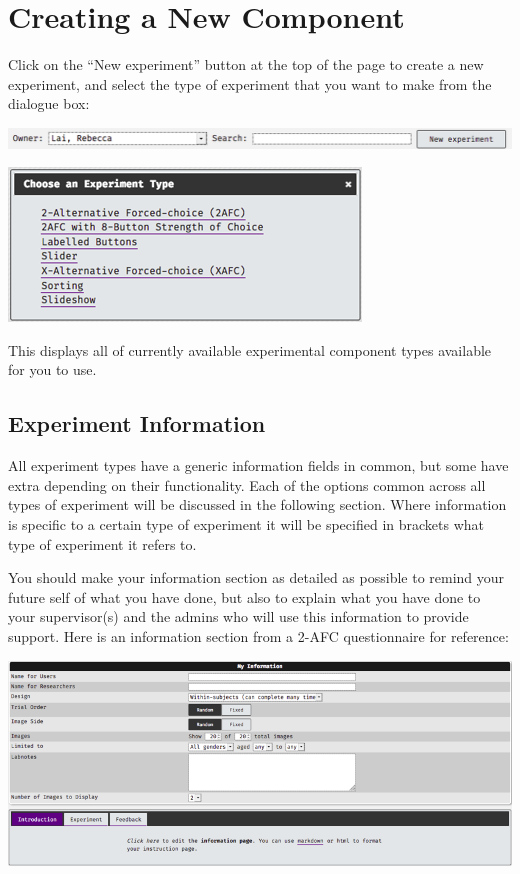 \documentclass[]{book}
\begin{document}
\section{Creating a New Component}\label{creating-a-new-component}

Click on the ``New experiment'' button at the top of the page to create
a new experiment, and select the type of experiment that you want to
make from the dialogue box:

\includegraphics{images/screenshots/exp_1.png}

\includegraphics{images/screenshots/exp_2.png}

This displays all of currently available experimental component types
available for you to use.

\subsection{Experiment Information}\label{experiment-information}

All experiment types have a generic information fields in common, but
some have extra depending on their functionality. Each of the options
common across all types of experiment will be discussed in the following
section. Where information is specific to a certain type of experiment
it will be specified in brackets what type of experiment it refers to.

You should make your information section as detailed as possible to
remind your future self of what you have done, but also to explain what
you have done to your supervisor(s) and the admins who will use this
information to provide support. Here is an information section from a
2-AFC questionnaire for reference:

\includegraphics{images/screenshots/exp_6.png}
\end{document}
